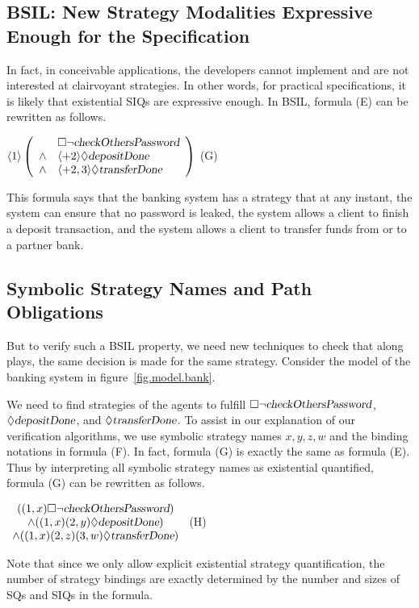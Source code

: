 \subsection{BSIL: New Strategy Modalities Expressive Enough for the Specification}
In fact, in conceivable applications, the developers cannot implement and are not interested at clairvoyant strategies.  
In other words, for practical specifications, it is likely that existential SIQs are expressive enough.
In BSIL, formula (E) can be rewritten as follows.
\begin{center} \hfill 
$\langle 1\rangle \left(\begin{array}{cl}
		& \Box \neg \mbox{\sl checkOthersPassword}\\
\wedge 	& \langle +2\rangle\Diamond \mbox{\sl depositDone} \\
\wedge  & \langle+2,3\rangle\Diamond\mbox{\sl transferDone} 
\end{array}\right)$
\hfill (G) 
\end{center}
This formula says that the banking system has a strategy that at any instant, the system can ensure that no password is leaked, the system allows a client to finish a deposit transaction, and the system allows a client to transfer funds from or to a partner bank.

\subsection{Symbolic Strategy Names and Path Obligations}
But to verify such a BSIL property, we need new techniques to check that along plays, the same decision is made for the same strategy.  
Consider the model of the banking system in figure~\ref{fig.model.bank}.  
\begin{figure*}[t] 
\begin{center} 
\caption{Game graph of a banking system} 
\label{fig.model.bank}
\end{center} 
\end{figure*} 
We need to find strategies of the agents to fulfill 
$\Box \neg \mbox{\sl checkOthersPassword}$, 
$\Diamond \mbox{\sl depositDone}$, and 
$\Diamond\mbox{\sl transferDone}$.  
To assist in our explanation of our verification algorithms, 
we use symbolic strategy names $x,y,z,w$ and the binding notations in formula (F).  
In fact, formula (G) is exactly the same as formula (E).  
Thus by interpreting all symbolic strategy names as existential quantified, 
formula (G) can be rewritten as follows.  
\begin{center} \hfill
$
\begin{array}{cl}
((1,x) \Box \neg \mbox{\sl checkOthersPassword}) \\
\wedge ((1,x)(2,y)\Diamond \mbox{\sl depositDone}) \\
\wedge ((1,x)(2,z)(3,w)\Diamond\mbox{\sl transferDone})
\end{array}
$
\hfill (H)
\end{center}   
Note that since we only allow explicit existential strategy quantification, 
the number of strategy bindings are exactly determined by the number and sizes of SQs and SIQs 
in the formula.  


